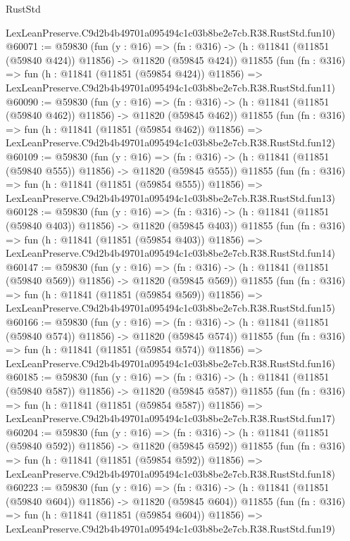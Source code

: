 \begin{lexlean}{RustStd}
\begin{coremodule}
    LexLeanPreserve.C9d2b4b49701a095494c1c03b8be2e7cb.R38.RustStd.fun10)
@60071 := @59830
    (fun (y : @16) =>
    (fn : @316) -> (h : @11841 (@11851 (@59840 @424)) @11856) -> @11820 (@59845 @424))
    @11855
    (fun (fn : @316) =>
    fun (h : @11841 (@11851 (@59854 @424)) @11856) =>
    LexLeanPreserve.C9d2b4b49701a095494c1c03b8be2e7cb.R38.RustStd.fun11)
@60090 := @59830
    (fun (y : @16) =>
    (fn : @316) -> (h : @11841 (@11851 (@59840 @462)) @11856) -> @11820 (@59845 @462))
    @11855
    (fun (fn : @316) =>
    fun (h : @11841 (@11851 (@59854 @462)) @11856) =>
    LexLeanPreserve.C9d2b4b49701a095494c1c03b8be2e7cb.R38.RustStd.fun12)
@60109 := @59830
    (fun (y : @16) =>
    (fn : @316) -> (h : @11841 (@11851 (@59840 @555)) @11856) -> @11820 (@59845 @555))
    @11855
    (fun (fn : @316) =>
    fun (h : @11841 (@11851 (@59854 @555)) @11856) =>
    LexLeanPreserve.C9d2b4b49701a095494c1c03b8be2e7cb.R38.RustStd.fun13)
@60128 := @59830
    (fun (y : @16) =>
    (fn : @316) -> (h : @11841 (@11851 (@59840 @403)) @11856) -> @11820 (@59845 @403))
    @11855
    (fun (fn : @316) =>
    fun (h : @11841 (@11851 (@59854 @403)) @11856) =>
    LexLeanPreserve.C9d2b4b49701a095494c1c03b8be2e7cb.R38.RustStd.fun14)
@60147 := @59830
    (fun (y : @16) =>
    (fn : @316) -> (h : @11841 (@11851 (@59840 @569)) @11856) -> @11820 (@59845 @569))
    @11855
    (fun (fn : @316) =>
    fun (h : @11841 (@11851 (@59854 @569)) @11856) =>
    LexLeanPreserve.C9d2b4b49701a095494c1c03b8be2e7cb.R38.RustStd.fun15)
@60166 := @59830
    (fun (y : @16) =>
    (fn : @316) -> (h : @11841 (@11851 (@59840 @574)) @11856) -> @11820 (@59845 @574))
    @11855
    (fun (fn : @316) =>
    fun (h : @11841 (@11851 (@59854 @574)) @11856) =>
    LexLeanPreserve.C9d2b4b49701a095494c1c03b8be2e7cb.R38.RustStd.fun16)
@60185 := @59830
    (fun (y : @16) =>
    (fn : @316) -> (h : @11841 (@11851 (@59840 @587)) @11856) -> @11820 (@59845 @587))
    @11855
    (fun (fn : @316) =>
    fun (h : @11841 (@11851 (@59854 @587)) @11856) =>
    LexLeanPreserve.C9d2b4b49701a095494c1c03b8be2e7cb.R38.RustStd.fun17)
@60204 := @59830
    (fun (y : @16) =>
    (fn : @316) -> (h : @11841 (@11851 (@59840 @592)) @11856) -> @11820 (@59845 @592))
    @11855
    (fun (fn : @316) =>
    fun (h : @11841 (@11851 (@59854 @592)) @11856) =>
    LexLeanPreserve.C9d2b4b49701a095494c1c03b8be2e7cb.R38.RustStd.fun18)
@60223 := @59830
    (fun (y : @16) =>
    (fn : @316) -> (h : @11841 (@11851 (@59840 @604)) @11856) -> @11820 (@59845 @604))
    @11855
    (fun (fn : @316) =>
    fun (h : @11841 (@11851 (@59854 @604)) @11856) =>
    LexLeanPreserve.C9d2b4b49701a095494c1c03b8be2e7cb.R38.RustStd.fun19)

\end{coremodule}
\end{lexlean}
